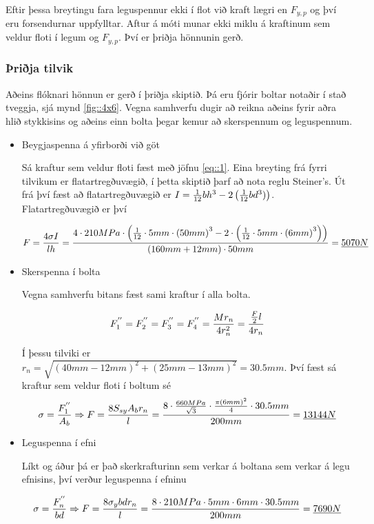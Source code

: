 Eftir þessa breytingu fara leguspennur ekki í flot við kraft lægri en $F_{y,p}$ og því eru forsendurnar uppfylltar. Aftur á móti munar ekki miklu á kraftinum sem veldur floti í legum og $F_{y,p}$. Því er þriðja hönnunin gerð.

\subsubsection{Þriðja tilvik}

Aðeins flóknari hönnun er gerð í þriðja skiptið. Þá eru fjórir boltar notaðir í stað tveggja, sjá mynd \ref{fig::4x6}. Vegna samhverfu dugir að reikna aðeins fyrir aðra hlið stykkisins og aðeins einn bolta þegar kemur að skerspennum og leguspennum. 

\begin{itemize}
	\item Beygjaspenna á yfirborði við göt
	
	Sá kraftur sem veldur floti fæst með jöfnu \ref{eq::1}. Eina breyting frá fyrri tilvikum er flatartregðuvægið, í þetta skiptið þarf að nota reglu Steiner's. Út frá því fæst að flatartregðuvægið er $I = {1 \over 12}bh^3 - 2\left({1 \over 12}bd^3)\right)$. Flatartregðuvægið er því
	
	\[
	F = \frac{4 \sigma I}{l h} = {4 \cdot 210 MPa \cdot \left({1 \over 12} \cdot 5 mm \cdot \left(50mm\right)^3 - 2 \cdot \left({1 \over 12} \cdot 5 mm \cdot \left(6mm\right)^3\right)\right) \over (160 mm + 12 mm) \cdot 50 mm} = \underline{5070N}
	\] 
	
	\item Skerspenna í bolta
	
	Vegna samhverfu bitans fæst sami kraftur í alla bolta. 
	
	\[
	F_1^{''} = F_2^{''} = F_3^{''} = F_4^{''} = {Mr_n \over 4r_n^2} = {{F \over 2}l \over 4 r_n} 
	\]
	
	Í þessu tilviki er $r_n = \sqrt{(40mm - 12mm)^2 + (25mm - 13mm)^2} = 30.5 mm$. Því fæst sá kraftur sem veldur floti í boltum sé 
		\[
		\sigma = {F_1^{''} \over A_b} \Rightarrow F = {8 S_{sy} A_b r_n \over l} = {8 \cdot {660MPa \over \sqrt{3}} \cdot {\pi \left(6mm\right)^2 \over 4} \cdot 30.5 mm \over 200 mm} = \underline{13144N}
		\]
	
	
	\item Leguspenna í efni
	
	Líkt og áður þá er það skerkrafturinn sem verkar á boltana sem verkar á legu efnisins, því verður leguspenna í efninu
	
	\[
	\sigma = {F_n^{''} \over bd} \Rightarrow F = {8 \sigma_{y} b d r_n \over l} = {8 \cdot 210 MPa \cdot 5 mm \cdot 6 mm \cdot 30.5 mm \over 200mm} = \underline{7690N}
	\]

\end{itemize}

